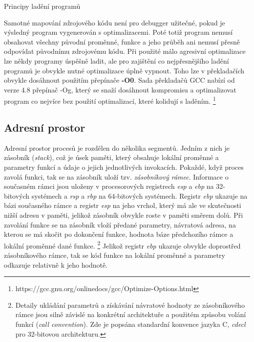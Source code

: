 \documentclass[czech,bachelor,male,python,dept460]{diploma}						%
\newcommand{\parspace}[1][]{
	\ifthenelse{\isempty{#1}}{\vspace{5mm}}{\vspace{#1}}
	\par
}
\begin{document}
\begin{section}{Principy ladění programů}
		\parspace Samotné mapování zdrojového kódu není pro debugger užitečné, pokud je výsledný program vygenerován s optimalizacemi. Poté
		totiž program nemusí obsahovat všechny původní proměnné, funkce a jeho průběh ani nemusí přesně odpovídat původnímu zdrojovému kódu.
		Při použité málo agresivní optimalizace lze někdy programy úspěšně ladit, ale pro zajištění co nejpřesnějšího ladění programů je obvykle nutné
		optimalizace úplně vypnout. Toho lze v překladačích obvykle dosáhnout použitím přepínače \textbf{-O0}. Sada překladačů GCC nabízí od verze 4.8
		přepínač -Og, který se snaží dosáhnout kompromisu a optimalizovat program co nejvíce bez použití optimalizací, které kolidují s laděním.
		\footnote{https://gcc.gnu.org/onlinedocs/gcc/Optimize-Options.html}
	
	\subsection{Adresní prostor}
		Adresní prostor procesů je rozdělen do několika segmentů\cite[53]{tanenbaum}. Jedním z nich je zásobník (\textit{stack}), což je úsek paměti, který
		obsahuje lokální proměnné a parametry funkcí a údaje o jejich jednotlivých invokacích. Pokaždé, když proces zavolá funkci, tak se na zásobník uloží tzv.
		\textit{zásobníkový rámec}. Informace o současném rámci jsou uloženy v procesorových registrech \textit{esp} a \textit{ebp} na 32-bitových systémech
		a \textit{rsp} a \textit{rbp} na 64-bitových systémech. Registr \textit{ebp} ukazuje na bázi současného rámce a registr \textit{esp} na jeho vrchol, který
		má ale ve skutečnosti nižší adresu v paměti, jelikož zásobník obvykle roste v paměti směrem dolů. Při zavolání funkce se na zásobník vloží předané parametry,
		návratová adresa, na kterou se má skočit po dokončení funkce, hodnota báze předchozího rámce a lokální proměnné dané funkce.
		\footnote{Detaily ukládání parametrů a získávání návratové hodnoty ze zásobníkového rámce jsou silně závislé na konkrétní architektuře
		a použitém způsobu volání funkcí (\textit{call convention}). Zde je popsána standardní konvence jazyka C, \textit{cdecl} pro 32-bitovou architekturu.}
		Jelikož registr \textit{ebp} ukazuje obvykle doprostřed zásobníkového rámce, tak se kód funkce na lokální proměnné a parametry odkazuje
		relativně k jeho hodnotě.
		
		

\end{section}
\end{document}
